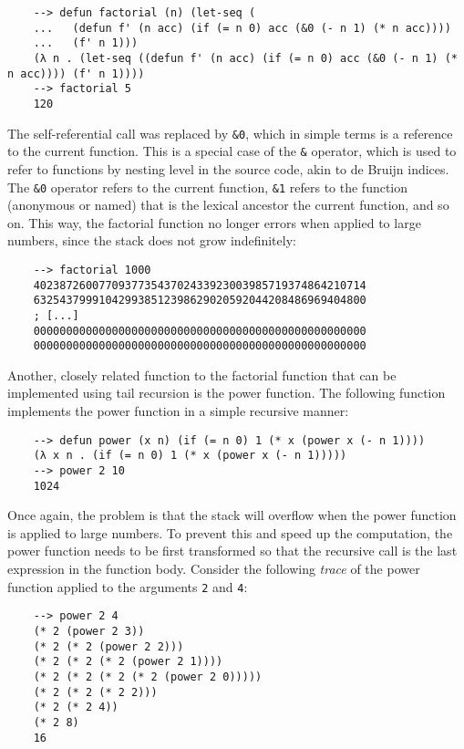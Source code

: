 \begin{Verbatim}
    --> defun factorial (n) (let-seq (
    ...   (defun f' (n acc) (if (= n 0) acc (&0 (- n 1) (* n acc))))
    ...   (f' n 1)))
    (λ n . (let-seq ((defun f' (n acc) (if (= n 0) acc (&0 (- n 1) (* n acc)))) (f' n 1))))
    --> factorial 5
    120
\end{Verbatim}

The self-referential call was replaced by \verb|&0|, which in simple terms is a reference to the current function. This is a special case of the \verb|&| operator, which is used to refer to functions by nesting level in the source code, akin to de Bruijn indices. The \verb|&0| operator refers to the current function, \verb|&1| refers to the function (anonymous or named) that is the lexical ancestor the current function, and so on. This way, the factorial function no longer errors when applied to large numbers, since the stack does not grow indefinitely:

\begin{Verbatim}
    --> factorial 1000
    402387260077093773543702433923003985719374864210714
    632543799910429938512398629020592044208486969404800
    ; [...]
    000000000000000000000000000000000000000000000000000
    000000000000000000000000000000000000000000000000000
\end{Verbatim}

Another, closely related function to the factorial function that can be implemented using tail recursion is the power function. The following function implements the power function in a simple recursive manner:

\begin{Verbatim}
    --> defun power (x n) (if (= n 0) 1 (* x (power x (- n 1))))
    (λ x n . (if (= n 0) 1 (* x (power x (- n 1)))))
    --> power 2 10
    1024
\end{Verbatim}

Once again, the problem is that the stack will overflow when the power function is applied to large numbers. To prevent this and speed up the computation, the power function needs to be first transformed so that the recursive call is the last expression in the function body. Consider the following \textit{trace} of the power function applied to the arguments \verb|2| and \verb|4|:

\begin{Verbatim}
    --> power 2 4
    (* 2 (power 2 3))
    (* 2 (* 2 (power 2 2)))
    (* 2 (* 2 (* 2 (power 2 1))))
    (* 2 (* 2 (* 2 (* 2 (power 2 0)))))
    (* 2 (* 2 (* 2 2)))
    (* 2 (* 2 4))
    (* 2 8)
    16
\end{Verbatim}

